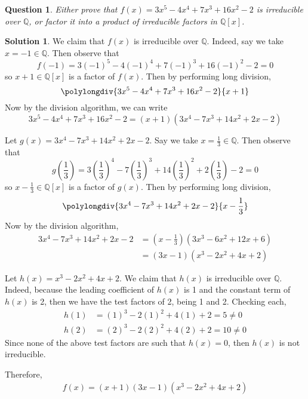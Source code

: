 \documentclass[11pt]{amsart}
\theoremstyle{}\newtheorem{question}{Question}
\theoremstyle{}\newtheorem*{bonus}{Bonus}
\theoremstyle{definition}\newtheorem*{solution}{Solution}
\newcommand{\Q}{\mathbb{Q}}
\begin{document}
\setcounter{question}{9}

\begin{question}
    Either prove that $f(x) = 3x^5 - 4x^4 + 7x^3 + 16x^2 - 2$ is irreducible over $\Q$, or factor it into a product of irreducible factors in $\Q[x]$.
\end{question}

\begin{solution}
    We claim that $f(x)$ is irreducible over $\Q$. Indeed, say we take $x = -1 \in \Q$. Then observe that
    \begin{equation*}
        f(-1) = 3(-1)^5 - 4(-1)^4 + 7(-1)^3 + 16(-1)^2 - 2 = 0
    \end{equation*}
    so $x + 1 \in \Q[x]$ is a factor of $f(x)$. Then by performing long division,
    \begin{equation*}
        \polylongdiv{3x^5 - 4x^4 + 7x^3 + 16x^2 - 2}{x + 1}
    \end{equation*}
    Now by the division algorithm, we can write
    \begin{equation*}
        3x^5 - 4x^4 + 7x^3 + 16x^2 - 2 = (x + 1)(3x^4 - 7x^3 + 14x^2 + 2x - 2)
    \end{equation*}
    
    Let $g(x) = 3x^4 - 7x^3 + 14x^2 + 2x - 2$. Say we take $x = \frac{1}{3} \in \Q$. Then observe that
    \begin{equation*}
        g\left(\frac{1}{3}\right) = 3\left(\frac{1}{3}\right)^4 - 7\left(\frac{1}{3}\right)^3 + 14\left(\frac{1}{3}\right)^2 + 2\left(\frac{1}{3}\right) - 2 = 0
    \end{equation*}
    so $x - \frac{1}{3} \in \Q[x]$ is a factor of $g(x)$. Then by performing long division,
    \begin{equation*}
        \polylongdiv{3x^4 - 7x^3 + 14x^2 + 2x - 2}{x - \frac{1}{3}}
    \end{equation*}
    Now by the division algorithm,
    \begin{align*}
        3x^4 - 7x^3 + 14x^2 + 2x - 2 &= \left(x - \frac{1}{3}\right)(3x^3 - 6x^2 + 12x + 6) \\
        &= (3x - 1)(x^3 - 2x^2 + 4x + 2)
    \end{align*}

    Let $h(x) = x^3 - 2x^2 + 4x + 2$. We claim that $h(x)$ is irreducible over $\Q$. Indeed, because the leading coefficient of $h(x)$ is 1 and the constant term of $h(x)$ is 2, then we have the test factors of 2, being 1 and 2. Checking each,
    \begin{align*}
        h(1) &= (1)^3 - 2(1)^2 + 4(1) + 2 = 5 \neq 0 \\
        h(2) &= (2)^3 - 2(2)^2 + 4(2) + 2 = 10 \neq 0
    \end{align*}
    Since none of the above test factors are such that $h(x) = 0$, then $h(x)$ is not irreducible.

    Therefore,
    \begin{align*}
        f(x) = (x + 1)(3x - 1)(x^3 - 2x^2 + 4x + 2)
    \end{align*}
\end{solution}
\end{document}
